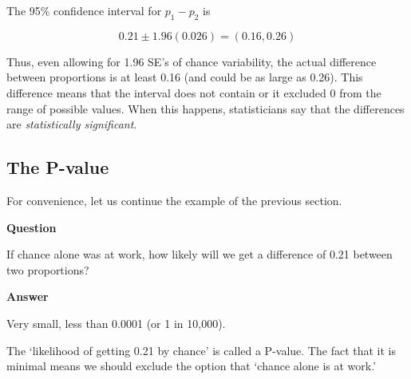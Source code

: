 \documentclass[11pt]{book}\usepackage[]{graphicx}\usepackage[]{color}
\begin{document}
\vspace{3mm}

The 95\% confidence interval for $p_1 - p_2$ is

\begin{equation*}
0.21 \pm 1.96 (0.026) = (0.16, 0.26)
\end{equation*}

Thus, even allowing for 1.96 SE's of chance variability, the actual difference between proportions is at least 0.16 (and could be as large as 0.26).  This difference means that the interval does not contain or it excluded 0 from the range of possible values.  When this happens, statisticians say that the differences are \textit{statistically significant}.


\subsection{The P-value}

For convenience, let us continue the example of the previous section.

\begin{minipage}[ht]{29mm}

\vspace{-4mm}

\textbf{Question}
\end{minipage}
\begin{minipage}[ht]{109mm}

\parbox{108mm}{
If chance alone was at work, how likely will we get a difference of 0.21 between two proportions?
}
\end{minipage}

\begin{minipage}[ht]{29mm}

\vspace{-3mm}

\textbf{Answer}
\end{minipage}
\begin{minipage}[ht]{109mm}

\parbox{108mm}{
Very small, less than 0.0001 (or 1 in 10,000).
}
\end{minipage}

The `likelihood of getting 0.21 by chance' is called a P-value. The fact that it is minimal means we should exclude the option that `chance alone is at work.'
\end{document}
